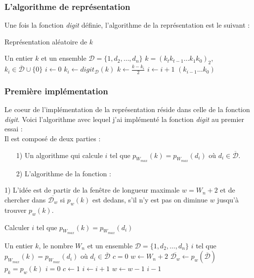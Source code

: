 \documentclass[12pt, a4paper]{memoir}
\begin{document}
\subsubsection{L'algorithme de représentation}

Une fois la fonction \emph{digit} définie, l'algorithme de la représentation est le suivant :

\begin{algorithm}
 \caption{Représentation aléatoire de $k$}
 \begin{algorithmic}
  \REQUIRE Un entier $k$ et un ensemble $\mathcal{D} = \{1,d_2,\ldots,d_n\}$
  \ENSURE $k = (k_t k_{t-1} \ldots k_1 k_0)_2$, $k_i \in  \overline{\mathcal{D}} \cup \{0\}$
  \STATE $i \leftarrow 0$
  \STATE $k_i \leftarrow digit_{\mathcal{D}}(k)$
  \STATE $k \leftarrow \frac{k-k_i}{2}$
  \STATE $i \leftarrow i+1$
  \ENDWHILE
  \RETURN $(k_{i-1} \ldots k_0)$
 \end{algorithmic}
\end{algorithm}

\subsubsection{Première implémentation}

Le coeur de l'implémentation de la représentation réside dans celle de la fonction \emph{digit}.
Voici l'algorithme avec lequel j'ai implémenté la fonction \emph{digit} au premier essai : \\
Il est composé de deux parties :
\begin{itemize}
 \item [1)] Un algorithme qui calcule $i$ tel que $p_{W_{max}}(k) = p_{W_{max}}(d_i)$ où $d_i \in \overline{\mathcal{D}}$.
 \item [2)] L'algorithme de la fonction :
\end{itemize}

1) L'idée est de partir de la fenêtre de longueur maximale $w=W_n+2$ et de chercher dans $\overline{\mathcal{D}_w}$
si $p_w(k)$ est dedans, s'il n'y est pas on diminue $w$ jusqu'à trouver $p_w(k)$.

\begin{algorithm}
 \caption{Calculer $i$ tel que $p_{W_{max}}(k) = p_{W_{max}}(d_i)$}
 \begin{algorithmic}
  \REQUIRE Un entier $k$, le nombre $W_n$ et un ensemble $\mathcal{D} = \{1,d_2,\ldots,d_n\}$
  \ENSURE $i$ tel que $p_{W_{max}}(k) = p_{W_{max}}(d_i)$ où $d_i \in \overline{\mathcal{D}}$
  \STATE $c = 0$  
  \STATE $w \leftarrow W_n+2$
  \STATE $\overline{\mathcal{D}_w} \leftarrow p_w(\overline{\mathcal{D}})$
  \STATE $p_k = p_w(k)$
  \STATE $i = 0$
  \STATE $c \leftarrow 1$
  \ENDIF
  \STATE $i \leftarrow i+1$
  \ENDWHILE
  \STATE $w \leftarrow w-1$
  \ENDWHILE
  \RETURN $i-1$
 \end{algorithmic}
\end{algorithm}
\end{document}
